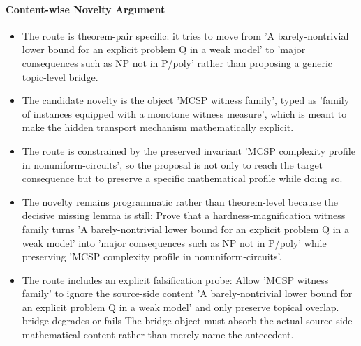 \documentclass[11pt]{article}
\begin{document}
\paragraph{Content-wise Novelty Argument}
\begin{itemize}[leftmargin=*,itemsep=0.2em]
\item The route is theorem-pair specific: it tries to move from 'A barely-nontrivial lower bound for an explicit problem Q in a weak model' to 'major consequences such as NP not in P/poly' rather than proposing a generic topic-level bridge.
\item The candidate novelty is the object 'MCSP witness family', typed as 'family of instances equipped with a monotone witness measure', which is meant to make the hidden transport mechanism mathematically explicit.
\item The route is constrained by the preserved invariant 'MCSP complexity profile in nonuniform-circuits', so the proposal is not only to reach the target consequence but to preserve a specific mathematical profile while doing so.
\item The novelty remains programmatic rather than theorem-level because the decisive missing lemma is still: Prove that a hardness-magnification witness family turns 'A barely-nontrivial lower bound for an explicit problem Q in a weak model' into 'major consequences such as NP not in P/poly' while preserving 'MCSP complexity profile in nonuniform-circuits'.
\item The route includes an explicit falsification probe: Allow 'MCSP witness family' to ignore the source-side content 'A barely-nontrivial lower bound for an explicit problem Q in a weak model' and only preserve topical overlap. bridge-degrades-or-fails The bridge object must absorb the actual source-side mathematical content rather than merely name the antecedent.
\end{itemize}
\end{document}
